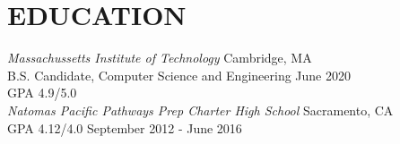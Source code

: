 \documentclass[8pt]{res}
\begin{document}
\opening

\vspace{-1em}

\section{EDUCATION} 
  {\sl Massachussetts Institute of Technology}               \hfill Cambridge, MA\\
    B.S. Candidate, Computer Science and Engineering         \hfill June 2020\\
    GPA 4.9/5.0 \\

  {\sl Natomas Pacific Pathways Prep Charter High School}    \hfill Sacramento, CA \\
    GPA 4.12/4.0                                             \hfill September 2012 - June 2016

\vspace{-1em}
\end{document}
